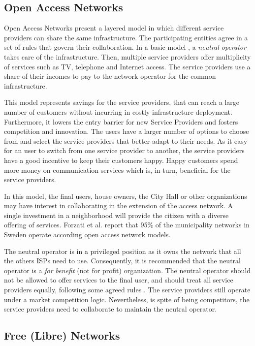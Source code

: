 \documentclass[journal]{IEEEtran}
\begin{document}
\subsection{Open Access Networks}

Open Access Networks present a layered model in which different service providers can share the same infrastructure.
The participating entities agree in a set of rules that govern their collaboration.
In a basic model \cite{battiti2005wireless}, a \emph{neutral operator} takes care of the infrastructure.
Then, multiple service providers offer multiplicity of services such as TV, telephone and Internet access.
The service providers use a share of their incomes to pay to the network operator for the common infrastructure.

This model represents savings for the service providers, that can reach a large number of customers without incurring in costly infrastructure deployment.
Furthermore, it lowers the entry barrier for new Service Providers and fosters competition and innovation.
The users have a larger number of options to choose from and select the service providers that better adapt to their needs.
As it easy for an user to switch from one service provider to another, the service providers have a good incentive to keep their customers happy.
Happy customers spend more money on communication services which is, in turn, beneficial for the service providers.

In this model, the final users, house owners, the City Hall or other organizations may have interest in collaborating in the extension of the access network.
A single investment in a neighborhood will provide the citizen with a diverse offering of services.
Forzati et al. \cite{forzati2010open} report that 95\% of the municipality networks in Sweden operate according open access network models.

The neutral operator is in a privileged position as it owns the network that all the others ISPs need to use.
Consequently, it is recommended that the neutral operator is a \emph{for benefit} (not for profit) organization.
The neutral operator should not be allowed to offer services to the final user, and should treat all service providers equally, following some agreed rules \cite{battiti2005wireless}.
The service providers still operate under a market competition logic.
Nevertheless, is spite of being competitors, the service providers need to collaborate to maintain the neutral operator.

\subsection{Free (Libre) Networks}
\end{document}
